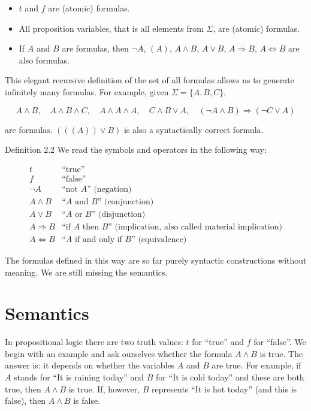 \documentclass[10pt]{book}
\begin{document}
\begin{itemize}
  \item $t$ and $f$ are (atomic) formulas.
  \item All proposition variables, that is all elements from $\Sigma$, are (atomic) formulas.
  \item If $A$ and $B$ are formulas, then $\neg A$, $(A)$, $A \wedge B$, $A \vee B$, $A \Rightarrow B$, $A \Leftrightarrow B$ are also formulas.
\end{itemize}

This elegant recursive definition of the set of all formulas allows us to generate infinitely many formulas. For example, given $\Sigma=\{A, B, C\}$,

\[
A \wedge B,\quad A \wedge B \wedge C,\quad A \wedge A \wedge A,\quad C \wedge B \vee A,\quad (\neg A \wedge B) \Rightarrow (\neg C \vee A)
\]

are formulas. $(((A)) \vee B)$ is also a syntactically correct formula.

Definition 2.2 We read the symbols and operators in the following way:

\[
\begin{array}{ll}
t & \text{``true''} \\
f & \text{``false''} \\
\neg A & \text{``not $A$'' (negation)} \\
A \wedge B & \text{``$A$ and $B$'' (conjunction)} \\
A \vee B & \text{``$A$ or $B$'' (disjunction)} \\
A \Rightarrow B & \text{``if $A$ then $B$'' (implication, also called material implication)} \\
A \Leftrightarrow B & \text{``$A$ if and only if $B$'' (equivalence)}
\end{array}
\]

The formulas defined in this way are so far purely syntactic constructions without meaning. We are still missing the semantics.

\section{Semantics}
In propositional logic there are two truth values: $t$ for ``true'' and $f$ for ``false''. We begin with an example and ask ourselves whether the formula $A \wedge B$ is true. The answer is: it depends on whether the variables $A$ and $B$ are true. For example, if $A$ stands for ``It is raining today'' and $B$ for ``It is cold today'' and these are both true, then $A \wedge B$ is true. If, however, $B$ represents ``It is hot today'' (and this is false), then $A \wedge B$ is false.
\end{document}
